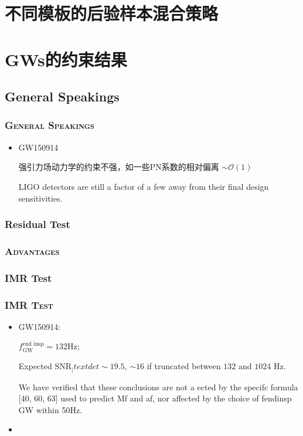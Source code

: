 \documentclass[CJK,aspectratio=169]{beamer}  %
\begin{document}
\section{不同模板的后验样本混合策略}


\section{GWs的约束结果}
\subsection{General Speakings}
\begin{frame}
	\frametitle{\textsc{General Speakings}}
	\begin{itemize}
		\item[$\bullet$] GW150914\cite{test_GR_GW150914}
			\par 强引力场动力学的约束不强，如一些PN系数的相对偏离 $\sim \mathcal{O}(1)$
			\par LIGO detectors are still a factor of a few away from their final design sensitivities.
	\end{itemize}
\end{frame}

\subsubsection{Residual Test}
\begin{frame}
	\frametitle{\textsc{Advantages}}
\end{frame}

\subsubsection{IMR Test}
\begin{frame}
	\frametitle{\textsc{IMR Test}}
	\begin{itemize}
		\item[1. ] GW150914\cite{test_GR_GW150914}: 
			\par $f_\text{GW}^\text{end insp} = 132 \text{Hz}$;
			\par Expected $\text{SNR}_|text{det} \sim 19.5$, $\sim 16$ if truncated between $132$ and $1024$ Hz.
			\par We have verified that these conclusions are not a ected by the specifc formula [40, 60, 63] used to predict Mf and af, nor affected by the choice of fendinsp GW within 50Hz.
		\item[2. ]
	\end{itemize}
\end{frame}
\end{document}
